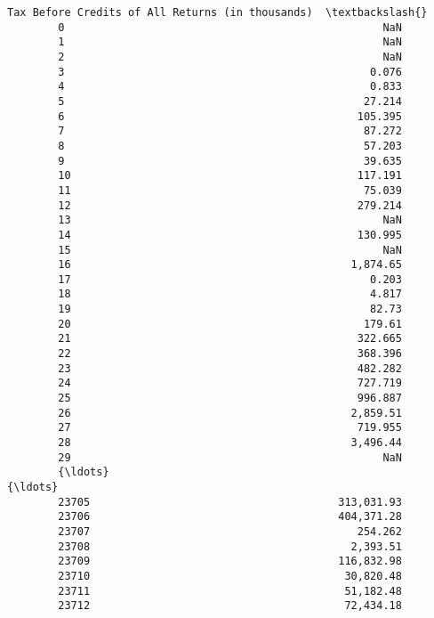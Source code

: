 \documentclass[11pt]{article}
\begin{document}
\begin{Verbatim}[commandchars=\\\{\}]
              Tax Before Credits of All Returns (in thousands)  \textbackslash{}
        0                                                  NaN   
        1                                                  NaN   
        2                                                  NaN   
        3                                                0.076   
        4                                                0.833   
        5                                               27.214   
        6                                              105.395   
        7                                               87.272   
        8                                               57.203   
        9                                               39.635   
        10                                             117.191   
        11                                              75.039   
        12                                             279.214   
        13                                                 NaN   
        14                                             130.995   
        15                                                 NaN   
        16                                            1,874.65   
        17                                               0.203   
        18                                               4.817   
        19                                               82.73   
        20                                              179.61   
        21                                             322.665   
        22                                             368.396   
        23                                             482.282   
        24                                             727.719   
        25                                             996.887   
        26                                            2,859.51   
        27                                             719.955   
        28                                            3,496.44   
        29                                                 NaN   
        {\ldots}                                                {\ldots}   
        23705                                       313,031.93   
        23706                                       404,371.28   
        23707                                          254.262   
        23708                                         2,393.51   
        23709                                       116,832.98   
        23710                                        30,820.48   
        23711                                        51,182.48   
        23712                                        72,434.18   

\end{Verbatim}
\end{document}
